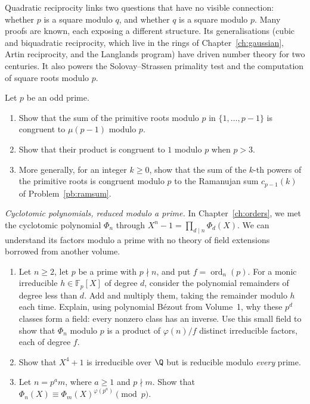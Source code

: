\begin{beauty}
Quadratic reciprocity links two questions that have no visible connection: whether $p$ is a square modulo $q$, and whether $q$ is a square modulo $p$. Many proofs are known, each exposing a different structure. Its generalisations (cubic and biquadratic reciprocity, which live in the rings of Chapter~\ref{ch:gaussian}, Artin reciprocity, and the Langlands program) have driven number theory for two centuries. It also powers the Solovay--Strassen primality test and the computation of square roots modulo $p$.
\end{beauty}

\begin{exercise}[$\star\star$]\label{pb:primsum}
Let $p$ be an odd prime.
\begin{enumerate}[label=(\alph*)]
\item Show that the sum of the primitive roots modulo $p$ in $\{1,\dots,p-1\}$ is congruent to $\mu(p-1)$ modulo $p$.
\item Show that their product is congruent to $1$ modulo $p$ when $p>3$.
\item More generally, for an integer $k\ge0$, show that the sum of the $k$-th powers of the primitive roots is congruent modulo $p$ to the
Ramanujan sum $c_{p-1}(k)$ of Problem~\ref{pb:ramsum}.
\end{enumerate}
\end{exercise}

\begin{exercise}[$\star\star$]\label{pb:phimodp}
\emph{Cyclotomic polynomials, reduced modulo a prime.}
In Chapter~\ref{ch:orders}, we met the cyclotomic polynomial
$\Phi_n$ through $X^n-1=\prod_{d\mid n}\Phi_d(X)$.
We can understand its factors modulo a prime with no theory
of field extensions borrowed from another volume.
\begin{enumerate}[label=(\alph*)]
\item Let $n\ge2$, let $p$ be a prime with $p\nmid n$,
and put $f=\operatorname{ord}_n(p)$.
For a monic irreducible $h\in\mathbb F_p[X]$ of degree $d$,
consider the polynomial remainders of degree less than $d$.
Add and multiply them, taking the remainder modulo $h$ each time.
Explain, using polynomial B\'ezout from Volume~1, why these
$p^d$ classes form a field: every nonzero class has an inverse.
Use this small field to show that $\Phi_n$ modulo $p$ is
a product of $\varphi(n)/f$ distinct irreducible factors,
each of degree $f$.
\item Show that $X^4+1$ is irreducible over $\Q$
but is reducible modulo \emph{every} prime.
\item Let $n=p^am$, where $a\ge1$ and $p\nmid m$.
Show that
$\Phi_n(X)\equiv\Phi_m(X)^{\varphi(p^a)}\pmod p$.
\end{enumerate}
\end{exercise}

